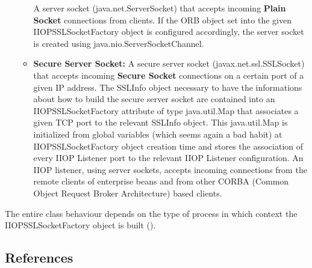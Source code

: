 \begin{itemize}
\begin{itemize}
				A server socket (java.net.ServerSocket) that accepts incoming \textbf{Plain Socket} connections from clients. If the ORB object set into the given IIOPSSLSocketFactory object is configured accordingly, the server socket is created using java.nio.ServerSocketChannel.
			\item \textbf{Secure Server Socket:}
				A secure server socket (javax.net.ssl.SSLSocket) that accepts incoming \textbf{Secure Socket} connections on a certain port of a given IP address.
				The SSLInfo object necessary to have the informations about how to build the secure server socket are contained into an IIOPSSLSocketFactory attribute of type java.util.Map that associates a given TCP port to the relevant SSLInfo object.
				This java.util.Map is initialized from global variables (which seems again a bad habit) at IIOPSSLSocketFactory object creation time and stores the association of every IIOP Listener port to the relevant IIOP Listener configuration.
				An IIOP listener, using server sockets, accepts incoming connections from the remote clients of enterprise beans and from other CORBA (Common Object Request Broker Architecture) based clients.
		\end{itemize}
\end{itemize}



The entire class behaviour depends on the type of process in which context the IIOPSSLSocketFactory object is built ().

\subsection{References}




